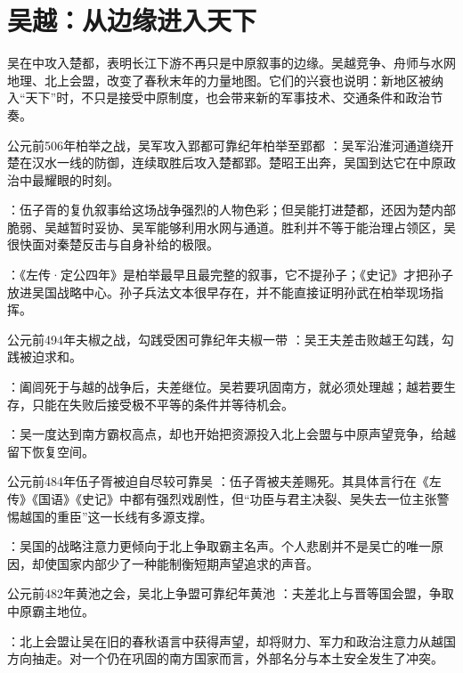 \section{吴越：从边缘进入天下}

吴在中攻入楚都，表明长江下游不再只是中原叙事的边缘。吴越竞争、舟师与水网地理、北上会盟，改变了春秋末年的力量地图。它们的兴衰也说明：新地区被纳入“天下”时，不只是接受中原制度，也会带来新的军事技术、交通条件和政治节奏。

\begin{event}{公元前506年}{柏举之战，吴军攻入郢都}{可靠纪年}{柏举至郢都}
：吴军沿淮河通道绕开楚在汉水一线的防御，连续取胜后攻入楚都郢。楚昭王出奔，吴国到达它在中原政治中最耀眼的时刻。

：伍子胥的复仇叙事给这场战争强烈的人物色彩；但吴能打进楚都，还因为楚内部脆弱、吴越暂时妥协、吴军能够利用水网与通道。胜利并不等于能治理占领区，吴很快面对秦楚反击与自身补给的极限。

：《左传·定公四年》是柏举最早且最完整的叙事，它不提孙子；《史记》才把孙子放进吴国战略中心。孙子兵法文本很早存在，并不能直接证明孙武在柏举现场指挥。
\end{event}

\begin{event}{公元前494年}{夫椒之战，勾践受困}{可靠纪年}{夫椒一带}
：吴王夫差击败越王勾践，勾践被迫求和。

：阖闾死于与越的战争后，夫差继位。吴若要巩固南方，就必须处理越；越若要生存，只能在失败后接受极不平等的条件并等待机会。

：吴一度达到南方霸权高点，却也开始把资源投入北上会盟与中原声望竞争，给越留下恢复空间。
\end{event}

\begin{event}{公元前484年}{伍子胥被迫自尽}{较可靠}{吴}
：伍子胥被夫差赐死。其具体言行在《左传》《国语》《史记》中都有强烈戏剧性，但“功臣与君主决裂、吴失去一位主张警惕越国的重臣”这一长线有多源支撑。

：吴国的战略注意力更倾向于北上争取霸主名声。个人悲剧并不是吴亡的唯一原因，却使国家内部少了一种能制衡短期声望追求的声音。
\end{event}

\begin{event}{公元前482年}{黄池之会，吴北上争盟}{可靠纪年}{黄池}
：夫差北上与晋等国会盟，争取中原霸主地位。

：北上会盟让吴在旧的春秋语言中获得声望，却将财力、军力和政治注意力从越国方向抽走。对一个仍在巩固的南方国家而言，外部名分与本土安全发生了冲突。
\end{event}


